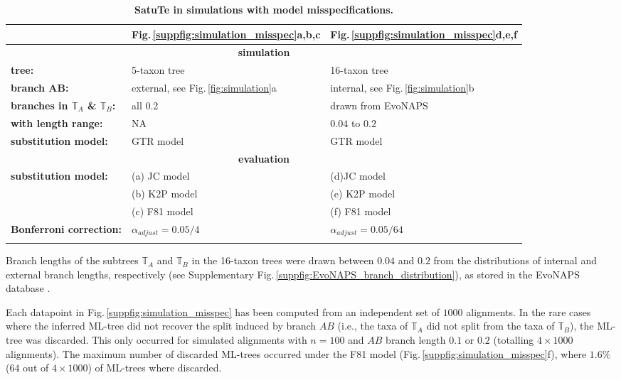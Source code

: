 \begin{appendices}
\newpage
\begin{longtable}{|p{}|p{}|p{}|}
\hline
   & \textbf{Fig.\,\ref{suppfig:simulation_misspec}a,b,c}&  \textbf{Fig.\,\ref{suppfig:simulation_misspec}d,e,f}\\
      \hline
      \hline
      \multicolumn{3}{|c|}{\textbf{simulation}}\\
      \hline
     \textbf{tree:} & 5-taxon tree & 16-taxon tree\\\hline
     \textbf{branch AB:} & 
        external, see Fig.\,\ref{fig:simulation}a
        & internal, see Fig.\,\ref{fig:simulation}b\\\hline
     \textbf{branches in $\mathbb{T}_A$ \& $\mathbb{T}_B$:} & 
      all 0.2 &
      drawn from EvoNAPS\\
      \hline
     \textbf{\hspace{1em}with length range:} & NA & $0.04$ to $0.2$\\\hline
     \textbf{substitution model:} & GTR model & GTR model \\\hline
      \hline 
      \multicolumn{3}{|c|}{\textbf{evaluation}}\\
      \hline 
     \textbf{substitution model:} &  (a) JC model & (d)JC model \\
     &(b) K2P model &(e) K2P model\\
     & (c) F81 model & (f) F81 model\\
     \hline
     \textbf{Bonferroni correction:} &  
       $\alpha_{adjust} = 0.05/4$ & $\alpha_{adjust} = 0.05/64$\\
   \hline
   \caption{\textbf{SatuTe in simulations with model misspecifications.}}\label{supptab:misspec}
\end{longtable}

Branch lengths of the subtrees $\mathbb{T}_A$ and $\mathbb{T}_B$ in the 16-taxon trees were drawn between $0.04$ and $0.2$ from the distributions of internal and external branch lengths, respectively  (see Supplementary Fig.\,\ref{suppfig:EvoNAPS_branch_distribution}), as stored in the EvoNAPS database . 

\medskip

Each datapoint in Fig.\,\ref{suppfig:simulation_misspec} has been computed from an independent set of $1000$ alignments.  In the rare cases where the inferred ML-tree did not recover the split induced by branch $AB$ (i.e., the taxa of $\mathbb{T}_A$ did not split from the taxa
of $\mathbb{T}_B$), the ML-tree was discarded. This only occurred for simulated alignments with $n = 100$ and $AB$ branch length $0.1$ or $0.2$ (totalling $4\times1000$ alignments). The maximum number of discarded ML-trees occurred under the F81 model (Fig.\,\ref{suppfig:simulation_misspec}f), where $1.6\%$ ($64$ out of $4\times1000$) of ML-trees where discarded.




\end{appendices}
